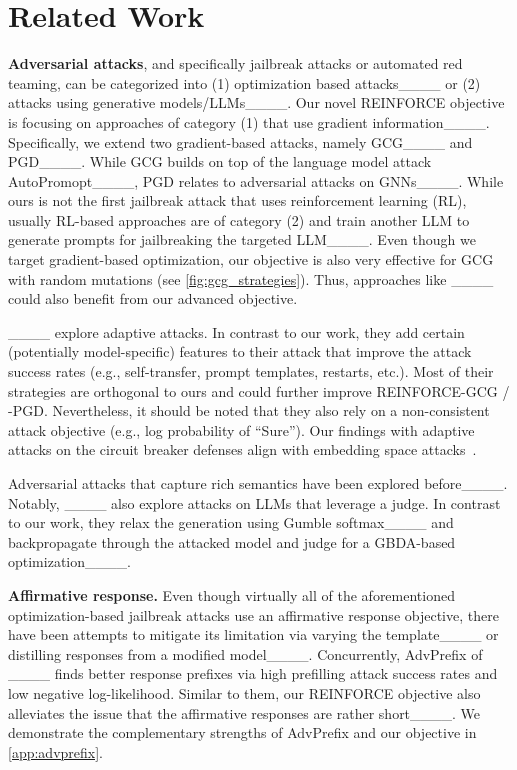\section{Related Work}
\textbf{Adversarial attacks}, and specifically jailbreak attacks or automated red teaming, can be categorized into (1) optimization based attacks____ or (2) attacks using generative models/LLMs____. Our novel REINFORCE objective is focusing on approaches of category (1) that use gradient information____. Specifically, we extend two gradient-based attacks, namely GCG____ and PGD____. While GCG builds on top of the language model attack AutoPromopt____, PGD relates to adversarial attacks on GNNs____. 
While ours is not the first jailbreak attack that uses reinforcement learning (RL), usually RL-based approaches are of category (2) and train another LLM to generate prompts for jailbreaking the targeted LLM____. 
Even though we target gradient-based optimization, our objective is also very effective for GCG with random mutations (see \autoref{fig:gcg_strategies}). Thus, approaches like ____ could also benefit from our advanced objective.

____ explore adaptive attacks. In contrast to our work, they add certain (potentially model-specific) features to their attack that improve the attack success rates (e.g., self-transfer, prompt templates, restarts, etc.). Most of their strategies are orthogonal to ours and could further improve REINFORCE-GCG / -PGD. Nevertheless, it should be noted that they also rely on a non-consistent attack objective (e.g., log probability of ``Sure''). Our findings with adaptive attacks on the circuit breaker defenses align with embedding space attacks~\cite {schwinn_revisiting_2024}.

Adversarial attacks that capture rich semantics have been explored before____. Notably, ____ also explore attacks on LLMs that leverage a judge. In contrast to our work, they relax the generation using Gumble softmax____ and backpropagate through the attacked model and judge for a GBDA-based optimization____. 

\textbf{Affirmative response.} Even though virtually all of the aforementioned optimization-based jailbreak attacks use an affirmative response objective, there have been attempts to mitigate its limitation via varying the template____ or distilling responses from a modified model____. Concurrently, AdvPrefix 
 of ____ finds better response prefixes via high prefilling attack success rates and low negative log-likelihood. Similar to them, our REINFORCE objective also alleviates the issue that the affirmative responses are rather short____. We demonstrate the complementary strengths of AdvPrefix and our objective in \autoref{app:advprefix}.

